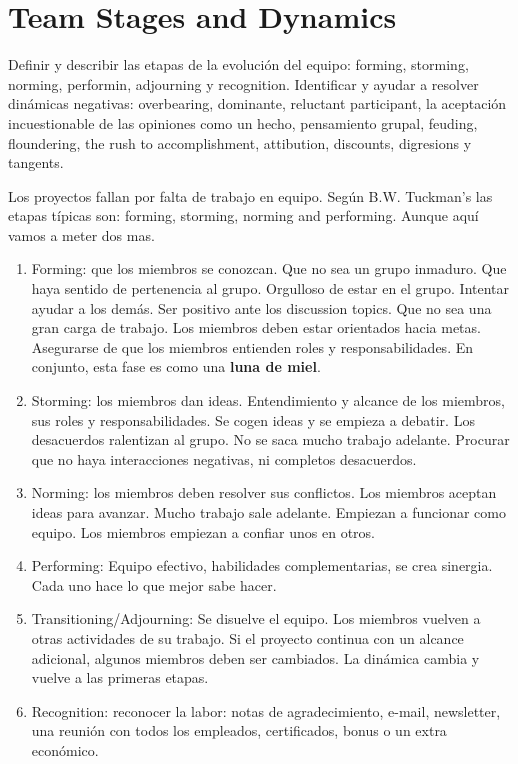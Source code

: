 \documentclass[oneside]{book}
\begin{document}
\section{Team Stages and Dynamics}

Definir y describir las etapas de la evolución del equipo: forming, storming, norming, performin, adjourning y recognition. Identificar y ayudar a resolver dinámicas negativas: overbearing, dominante, reluctant participant, la aceptación incuestionable de las opiniones como un hecho, pensamiento grupal, feuding, floundering, the rush to accomplishment, attibution, discounts, digresions y tangents.

Los proyectos fallan por falta de trabajo en equipo. Según B.W. Tuckman's las etapas típicas son: forming, storming, norming and performing. Aunque aquí vamos a meter dos mas.

\begin{enumerate}
	\item Forming: que los miembros se conozcan. Que no sea un grupo inmaduro. Que haya sentido de pertenencia al grupo. Orgulloso de estar en el grupo. Intentar ayudar a los demás. Ser positivo ante los discussion topics. Que no sea una gran carga de trabajo. Los miembros deben estar orientados hacia metas. Asegurarse de que los miembros entienden roles y responsabilidades. En conjunto, esta fase es como una \textbf{luna de miel}.
	\item Storming: los miembros dan ideas. Entendimiento y alcance de los miembros, sus roles y responsabilidades. Se cogen ideas y se empieza a debatir. Los desacuerdos ralentizan al grupo. No se saca mucho trabajo adelante. Procurar que no haya interacciones negativas, ni completos desacuerdos.
	\item Norming: los miembros deben resolver sus conflictos. Los miembros aceptan ideas para avanzar. Mucho trabajo sale adelante. Empiezan a funcionar como equipo. Los miembros empiezan a confiar unos en otros. 
	\item Performing: Equipo efectivo, habilidades complementarias, se crea sinergia. Cada uno hace lo que mejor sabe hacer.
	\item Transitioning/Adjourning: Se disuelve el equipo. Los miembros vuelven a otras actividades de su trabajo. Si el proyecto continua con un alcance adicional, algunos miembros deben ser cambiados. La dinámica cambia y vuelve a las primeras etapas. 
	\item Recognition: reconocer la labor: notas de agradecimiento, e-mail, newsletter, una reunión con todos los empleados, certificados, bonus o un extra económico.
\end{enumerate}
\end{document}
